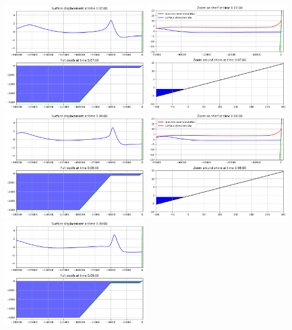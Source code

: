 \documentclass[11pt]{article}
\begin{document}
\vskip 10pt 
\includegraphics[width=0.475\textwidth]{frame0007fig0.png}
\includegraphics[width=0.475\textwidth]{frame0007fig1.png}
\vskip 10pt 
\includegraphics[width=0.475\textwidth]{frame0008fig0.png}
\includegraphics[width=0.475\textwidth]{frame0008fig1.png}
\vskip 10pt 
\includegraphics[width=0.475\textwidth]{frame0009fig0.png}
\end{document}
